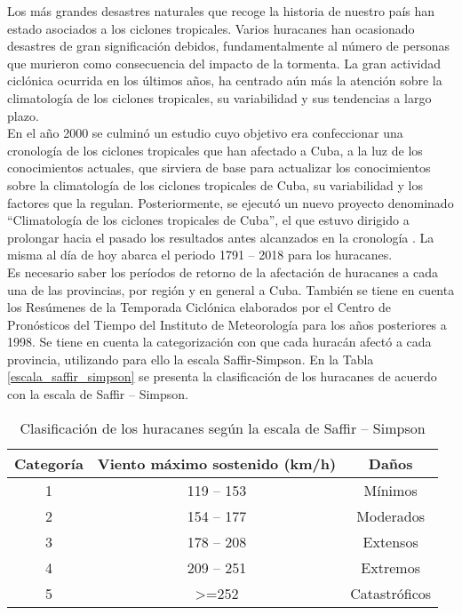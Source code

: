 \begin{introduction}

Los más grandes desastres naturales que recoge la historia de nuestro país han estado asociados a los ciclones tropicales. Varios huracanes han ocasionado desastres de gran significación debidos, fundamentalmente al número de personas que murieron como consecuencia del impacto de la tormenta. La gran actividad ciclónica ocurrida en los últimos años, ha centrado aún más la atención sobre la climatología de los ciclones tropicales, su variabilidad y sus tendencias a largo plazo.\\ 
En el año 2000 se culminó un estudio cuyo objetivo era confeccionar una cronología de los ciclones tropicales que han afectado a Cuba, a la luz de los conocimientos actuales, que sirviera de base para actualizar los conocimientos sobre la climatología de los ciclones tropicales de Cuba, su variabilidad y los factores que la regulan. Posteriormente, se ejecutó un nuevo proyecto denominado “Climatología de los ciclones tropicales de Cuba”, el que estuvo dirigido a prolongar hacia el pasado los resultados antes alcanzados en la cronología \cite{DK4, DK5}. La misma al día de hoy abarca el periodo 1791 – 2018 para los huracanes.\\
Es necesario saber los períodos de retorno de la afectación de huracanes a cada una de las provincias, por región y en general a Cuba. También se tiene en cuenta los Resúmenes de la Temporada Ciclónica elaborados por el Centro de Pronósticos del Tiempo del Instituto de Meteorología para los años posteriores a 1998. Se tiene en cuenta la categorización con que cada huracán afectó a cada provincia, utilizando para ello la escala Saffir-Simpson. En la Tabla \ref{escala_saffir_simpson} se presenta la clasificación de los huracanes de acuerdo con la escala de Saffir – Simpson.\\ 


\begin{table}
\begin{center}
\caption{Clasificación de los huracanes según la escala de Saffir – Simpson}

\begin{tabular}{| c | c | c |} 
\hline
Categoría & Viento máximo sostenido (km/h) & Daños\\
\hline\hline
1  & 119 – 153 & Mínimos\\
\hline
2 & 154 – 177 & Moderados\\
\hline
3 & 178 – 208 & Extensos\\
\hline
4 & 209 – 251 & Extremos\\
\hline
5 & >=252 & Catastróficos\\
\hline
\end{tabular}


\end{center}
\end{table}
\end{introduction}
